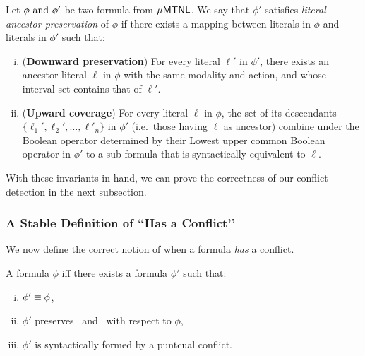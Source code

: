 \begin{definition}
\label{def:lit-ancestor}
Let $\phi \text{ and } \phi'$ be two formula from $\mathsf{\mu MTNL}$.
We say that $\phi'$ satisfies \emph{literal ancestor preservation} of $\phi$ if there exists a mapping between literals in $\phi$ and literals in $\phi'$ such that:
\begin{enumerate}[(i)]
    \item (\textbf{Downward preservation})  
    For every literal $\ell'$ in $\phi'$, there exists an ancestor literal $\ell$ in $\phi$ with the same modality and action, and whose interval set contains that of $\ell'$.
    \item (\textbf{Upward coverage})  
    For every literal $\ell$ in $\phi$, the set of its descendants$\{\ell_1', \ell_2', \dots, \ell'_n \}$ in $\phi'$ (i.e.\ those having $\ell$ as ancestor) combine under the Boolean operator determined by their Lowest upper common Boolean operator in $\phi'$ to a sub-formula that is syntactically equivalent to $\ell$.
\end{enumerate}
\end{definition}
With these invariants in hand, we can prove the correctness of our conflict detection in the next subsection.

\subsubsection{A Stable Definition of “Has a Conflict’’}

We now define the correct notion of when a formula \emph{has} a conflict.

\begin{definition}\label{def:has-conflict}
A formula $\phi$  iff there exists a formula $\phi'$ such that:
\begin{enumerate}[(i)]
    \item $\phi' \equiv  \phi$,
    \item $\phi'$ preserves \LUCO\ and \LAP\ with respect to $\phi$,
    \item $\phi'$ is syntactically formed by a puntcual conflict.
\end{enumerate}
\end{definition}


